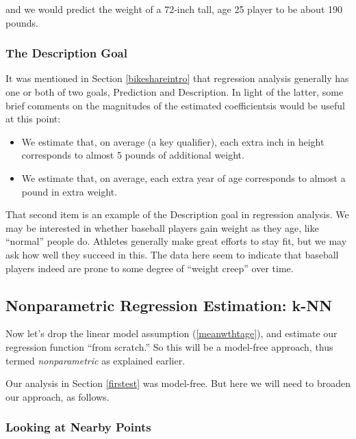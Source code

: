 and we would predict the weight of a 72-inch tall, age 25 player to be
about 190 pounds.

\subsubsection{The Description Goal}
\label{baseballdescribe}

It was mentioned in Section \ref{bikeshareintro} that regression
analysis generally has one or both of two goals, Prediction and
Description.  In light of the latter, some brief comments on the
magnitudes of the estimated coefficientsis would be useful at this
point:

\begin{itemize}

\item We estimate that, on average (a key qualifier), each extra inch in
height corresponds to almost 5 pounds of additional weight.  

\item We estimate that, on average, each extra year of age corresponds
to almost a pound in extra weight.

\end{itemize}

That second item is an example of the Description goal in regression
analysis.  We may be interested in whether baseball players gain weight
as they age, like ``normal'' people do.  Athletes generally make great
efforts to stay fit, but we may ask how well they succeed in this.  The
data here seem to indicate that baseball players indeed are prone to
some degree of ``weight creep'' over time.
\label{weightcreep}

\subsection{Nonparametric Regression Estimation: k-NN}

Now let's drop the linear model assumption (\ref{meanwthtage}), and
estimate our regression function ``from scratch.''  So this will be a
model-free approach, thus termed {\it nonparametric} as explained
earlier.

Our analysis in Section \ref{firstest} was model-free.  But here we will
need to broaden our approach, as follows.

\subsubsection{Looking at Nearby Points}
\label{euclid}

